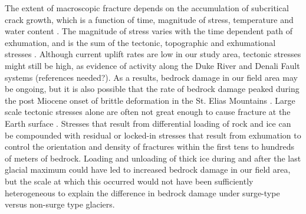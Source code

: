 \documentclass[review]{igs}
\begin{document}
The extent of macroscopic fracture depends on the accumulation of subcritical crack growth, which is a function of time, magnitude of stress, temperature and water content \citep[e.g.][]{Atkinson1984,Kemeny2003,Molnar2004}. The magnitude of stress varies with the time dependent path of exhumation, and is the sum of the tectonic, topographic and exhumational stresses  \citep[e.g.][]{Leith2014a}. Although current uplift rates are low in our study area, tectonic stresses might still be high, as evidence of activity along the Duke River and Denali Fault systems (references needed?). As a results, bedrock damage in our field area may be ongoing, but it is also possible that the rate of bedrock damage peaked during the post Miocene onset of brittle deformation in the St. Elias Mountains \citep{Eisbacher1977}. Large scale tectonic stresses alone are often not great enough to cause fracture at the Earth surface \citep{Leith2014a}. Stresses that result from differential loading of rock and ice \citep[e.g.][]{Savage1986,Miller1996,Augustinus1995,Kinakin2005,Leith2014a,Molnar2004} can be compounded with residual or locked-in stresses that result from exhumation \citep[e.g.][]{Barrows2008} to control the orientation and density of fractures within the first tens to hundreds of meters of bedrock. Loading and unloading of thick ice during and after the last glacial maximum could have led to increased bedrock damage in our field area, but the scale at which this occurred would not have been sufficiently heterogeneous to explain the difference in bedrock damage under surge-type versus non-surge type glaciers. 
\end{document}
